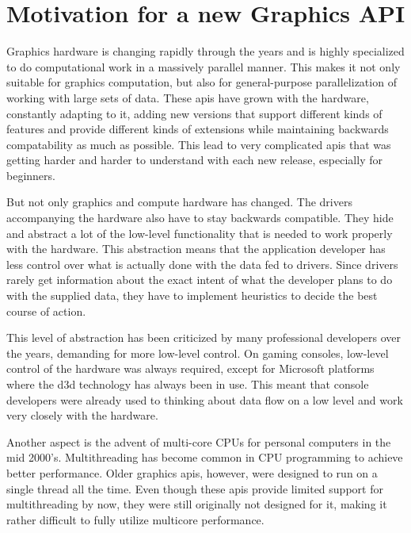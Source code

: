    \tbd


  \section{Motivation for a new Graphics API}

    Graphics hardware is changing rapidly through the years and is highly specialized to do computational work in a massively parallel manner. This makes it not only suitable for graphics computation, but also for general-purpose parallelization of working with large sets of data. These \glspl{api} have grown with the hardware, constantly adapting to it, adding new versions that support different kinds of features and provide different kinds of extensions while maintaining backwards compatability as much as possible. This lead to very complicated \glspl{api} that was getting harder and harder to understand with each new release, especially for beginners.


    But not only graphics and compute hardware has changed. The drivers accompanying the hardware also have to stay backwards compatible. They hide and abstract a lot of the low-level functionality that is needed to work properly with the hardware. This abstraction means that the application developer has less control over what is actually done with the data fed to drivers. Since drivers rarely get information about the exact intent of what the developer plans to do with the supplied data, they have to implement heuristics to decide the best course of action.

    This level of abstraction has been criticized by many professional developers over the years, demanding for more low-level control. On gaming consoles, low-level control of the hardware was always required, except for Microsoft platforms where the \gls{d3d} technology has always been in use. This meant that console developers were already used to thinking about data flow on a low level and work very closely with the hardware.

    Another aspect is the advent of multi-core CPUs for personal computers in the mid 2000's. Multithreading has become common in CPU programming to achieve better performance. Older graphics \glspl{api}, however, were designed to run on a single thread all the time. Even though these \glspl{api} provide limited support for multithreading by now, they were still originally not designed for it, making it rather difficult to fully utilize multicore performance.

